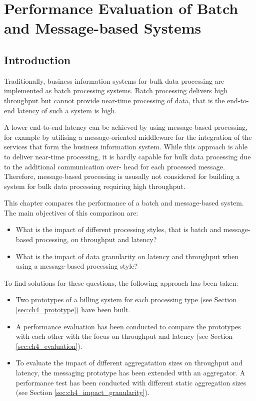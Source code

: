\chapter{Performance Evaluation of Batch and Message-based Systems}\label{ch:performance_evaluation}

\section{Introduction}\label{sec:ch4_introduction}

Traditionally, business information systems for bulk data processing are implemented as batch processing systems. Batch processing delivers high throughput but cannot provide near-time processing of data, that is the end-to-end latency of such a system is high. 

A lower end-to-end latency can be achieved by using message-based processing, for example by utilising a message-oriented middleware for the integration of the services that form the business information system. While this approach is able to deliver near-time processing, it is hardly capable for bulk data processing due to the additional communication over- head for each processed message. Therefore, message-based processing is ususally not considered for building a system for bulk data processing requiring high throughput.

This chapter compares the performance of a batch and message-based system. The main objectives of this comparison are:

\begin{itemize}
  \item What is the impact of different processing styles, that is batch and message-based processing, on throughput and latency?
  \item What is the impact of data granularity on latency and throughput when using a message-based processing style?  
\end{itemize}

To find solutions for these questions, the following approach has been taken:

\begin{itemize}
	\item Two prototypes of a billing system for each processing type (see Section \ref{sec:ch4_prototype}) have been built. 
	\item A performance evaluation has been conducted to compare the prototypes with each other with the focus on throughput and latency (see Section \ref{sec:ch4_evaluation}).
	\item To evaluate the impact of different aggregatation sizes on throughput and latency, the messaging prototype has been extended with an aggregator. A performance test has been conducted with different static aggregation sizes (see Section \ref{sec:ch4_impact_granularity}).
\end{itemize}

